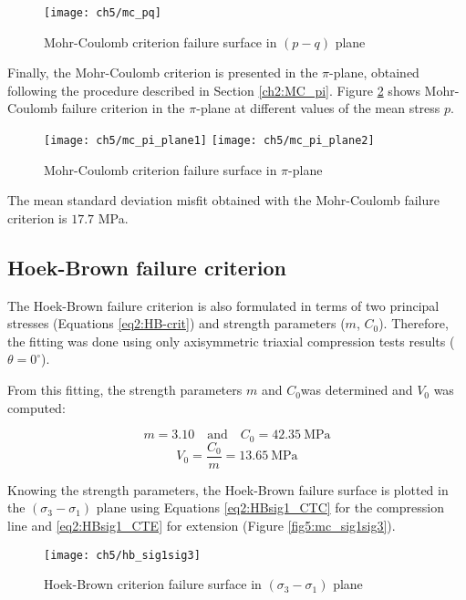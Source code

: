 \begin{figure}[p]
    \centering
    \texttt{[image: ch5/mc\_pq]}
    \caption{Mohr-Coulomb criterion failure surface in  $(p-q)$ plane}
    \label{fig5:mc_pq}
\end{figure} 

Finally, the Mohr-Coulomb criterion is presented in the $\pi$-plane, obtained following the procedure described in Section \ref{ch2:MC_pi}. Figure \ref{fig5:mc_pi_plane} shows Mohr-Coulomb failure criterion in the $\pi$-plane at different values of the mean stress $p$.

\begin{figure}[tb]
    \centering
    \texttt{[image: ch5/mc\_pi\_plane1]}
    \texttt{[image: ch5/mc\_pi\_plane2]}
    \caption{Mohr-Coulomb criterion failure surface in  $\pi$-plane}
    \label{fig5:mc_pi_plane}
\end{figure} 

The mean standard deviation misfit obtained with the Mohr-Coulomb failure criterion is $17.7$ \si{\mega\pascal}. 

\subsection{Hoek-Brown failure criterion}

The Hoek-Brown failure criterion is also formulated in terms of two principal stresses (Equations \ref{eq2:HB-crit}) and strength parameters ($m$, $C_0$). Therefore, the fitting was done using only axisymmetric triaxial compression tests results ($\theta = 0^\circ$). 

From this fitting, the strength parameters $m$ and $C_0$was determined and $V_0$ was computed: 

\begin{equation}
    m = 3.10 \quad \textrm{and} \quad C_0 = \SI{42.35}{\mega\pascal}
\end{equation}
\begin{equation}
    V_0 = \frac{C_0}{m} = \SI{13.65}{\mega\pascal}
\end{equation}

Knowing the strength parameters, the Hoek-Brown failure surface is plotted in the $(\sigma_3-\sigma_1)$ plane using Equations \ref{eq2:HBsig1_CTC} for the compression line and \ref{eq2:HBsig1_CTE} for extension (Figure \ref{fig5:mc_sig1sig3}).

\begin{figure}[p]
    \centering
    \texttt{[image: ch5/hb\_sig1sig3]}
    \caption{Hoek-Brown criterion failure surface in  $(\sigma_3-\sigma_1)$ plane}
    \label{fig5:hb_sig1sig3}
\end{figure} 

